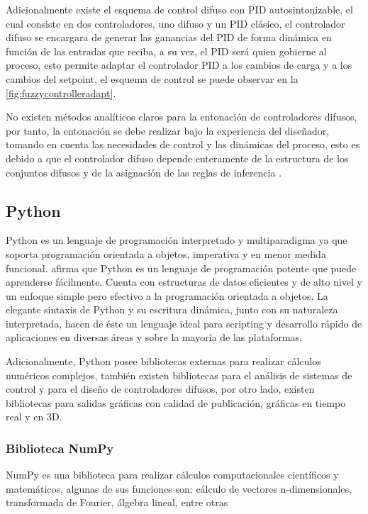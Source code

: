 			Adicionalmente existe el esquema de control difuso con PID autosintonizable, el cual consiste en dos controladores, uno difuso y un PID clásico, el controlador difuso se encargara de generar las ganancias del PID de forma dinámica en función de las entradas que reciba, a su vez, el PID será quien gobierne al proceso, esto permite adaptar el controlador PID a los cambios de carga y a los cambios del setpoint, el esquema de control se puede observar en la \cref{fig:fuzzycontrolleradapt}.

			No existen métodos analíticos claros para la entonación de controladores difusos, por tanto, la entonación se debe realizar bajo la experiencia del diseñador, tomando en cuenta las necesidades de control y las dinámicas del proceso, esto es debido a que el controlador difuso depende enteramente de la estructura de los conjuntos difusos y de la asignación de las reglas de inferencia \Parencite{cruz2010inteligencia}.
		
	\subsection{Python}
		
		Python es un lenguaje de programación interpretado y multiparadigma ya que soporta programación orientada a objetos, imperativa y en menor medida funcional. \textcite{guido2017tutorial} afirma que Python es un lenguaje de programación potente que puede aprenderse fácilmente. Cuenta con estructuras de datos eficientes y de alto
		nivel y un enfoque simple pero efectivo a la programación orientada a objetos. La elegante sintaxis de Python y su escritura
		dinámica, junto con su naturaleza interpretada, hacen de éste un lenguaje ideal para scripting y desarrollo rápido de
		aplicaciones en diversas áreas y sobre la mayoría de las plataformas.
		
		Adicionalmente, Python posee bibliotecas externas para realizar cálculos numéricos complejos, también existen bibliotecas para el análisis de sistemas de control y para el diseño de controladores difusos, por otro lado, existen bibliotecas para salidas gráficas con calidad de publicación, gráficas en tiempo real y en 3D.
		
		\subsubsection{Biblioteca NumPy}

			NumPy es una biblioteca para realizar cálculos computacionales científicos y matemáticos, algunas de sus funciones son: cálculo de vectores n-dimensionales, transformada de Fourier, álgebra lineal, entre otras \Parencite{numpy}

